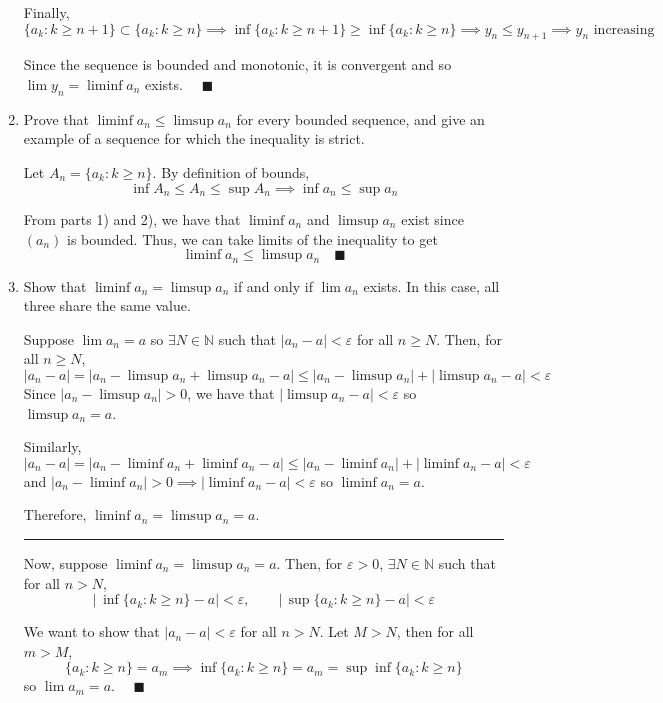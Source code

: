 \documentclass[12pt]{article}
\newcommand{\N}{\mathbb{N}}
\newcommand{\qed}{\quad \blacksquare}
\newcommand{\abs}[1]{\left\vert #1 \right\vert}
\newcommand{\ep}{\varepsilon}
\begin{document}
\begin{enumerate}
            Finally, 
            \[\{a_k: k \geq n+1\} \subset \{a_k: k \geq n\} \implies \inf\{a_k: k \geq n + 1\} \geq \inf\{a_k: k \geq n\} \implies y_n \leq y_{n+1} \implies y_n \text{ increasing}\]

            Since the sequence is bounded and monotonic, it is convergent and so $\lim y_n = \liminf a_n$ exists. $\qed$
        \color{black}

	\item Prove that $\liminf a_n\leq \limsup a_n$ for every bounded sequence, and give an example of a sequence for which the inequality is strict.
	
        \color{blue}
            Let $A_n = \{a_k: k \geq n\}$. By definition of bounds, 
            \[\inf A_n \leq A_n \leq \sup A_n \implies \inf a_n \leq \sup a_n\]

            From parts 1) and 2), we have that $\liminf a_n$ and $\limsup a_n$ exist since $(a_n)$ is bounded. Thus, we can take limits of the inequality to get
            \[\liminf a_n \leq \limsup a_n \qed\]
        \color{black}


	\item Show that $\liminf a_n=\limsup a_n$ if and only if $\lim a_n$ exists. In this case, all three share the same value. 
	
        \color{blue}
            Suppose $\lim a_n = a$ so $\exists N \in \N$ such that $\abs{a_n - a} < \ep$ for all $n \geq N$. Then, for all $n \geq N$, 
            \[\abs{a_n - a} = \abs{a_n - \limsup a_n + \limsup a_n - a} \leq \abs{a_n - \limsup a_n} + \abs{\limsup a_n - a} < \ep\]
            Since $\abs{a_n - \limsup a_n} > 0$, we have that $\abs{\limsup a_n - a} < \ep$ so $\limsup a_n = a$.
            
            Similarly, 
            \[\abs{a_n - a} = \abs{a_n - \liminf a_n + \liminf a_n - a} \leq \abs{a_n - \liminf a_n} + \abs{\liminf a_n - a} < \ep\]
            and $\abs{a_n - \liminf a_n} > 0 \implies \abs{\liminf a_n - a} < \ep$ so $\liminf a_n = a$.

            Therefore, $\liminf a_n = \limsup a_n = a$.

            \vspace*{10pt}
            \hrule 
            \vspace*{10pt}
            Now, suppose $\liminf a_n = \limsup a_n = a$. Then, for $\ep >0$, $\exists N \in \N$ such that for all $n > N$, 
            \[\abs{\,\inf\{a_k: k \geq n\} - a} < \ep, \qquad \abs{\,\sup\{a_k: k \geq n\} - a} < \ep\]

            We want to show that $\abs{a_n - a} < \ep$ for all $n > N$. Let $M > N$, then for all $m > M$, 
            \[\{a_k: k \geq n\} = a_m \implies \inf\{a_k: k\geq n\} = a_m = \sup \inf\{a_k: k\geq n\}\]
            so $\lim a_m = a$. $\qed$
        \color{black}
\end{enumerate}
\end{document}
